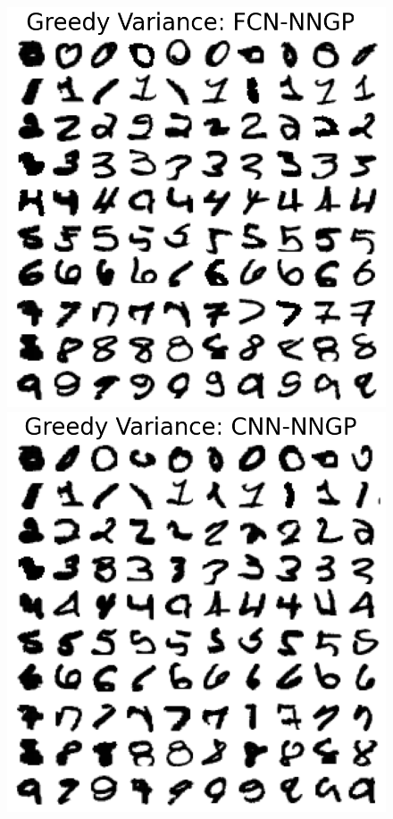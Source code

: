 \documentclass{article}
\numberwithin{equation}{section}
\begin{document}
\begin{figure}[h!]
\begin{minipage}{.25\textwidth}
\end{minipage}%
\begin{minipage}{.25\textwidth}
  \centering
  \includegraphics[width=\linewidth]{thesis-report/figures/mnist_inducing_point/greedy_mnist_fcn_nngp_inducing_point_selection.png}
\end{minipage}%
\begin{minipage}{.25\textwidth}
  \centering
  \includegraphics[width=\linewidth]{thesis-report/figures/mnist_inducing_point/greedy_mnist_cnn_nngp_inducing_point_selection.png}

\end{minipage}
\end{figure}
\end{document}
